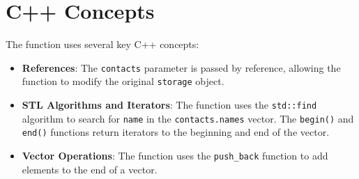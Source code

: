 \section{C++ Concepts}

The function uses several key C++ concepts:

\begin{itemize}
    \item \textbf{References}: The \texttt{contacts} parameter is passed by reference, allowing the function to modify the original \texttt{storage} object.
    \item \textbf{STL Algorithms and Iterators}: The function uses the \texttt{std::find} algorithm to search for \texttt{name} in the \texttt{contacts.names} vector. The \texttt{begin()} and \texttt{end()} functions return iterators to the beginning and end of the vector.
    \item \textbf{Vector Operations}: The function uses the \texttt{push\_back} function to add elements to the end of a vector.
\end{itemize}

